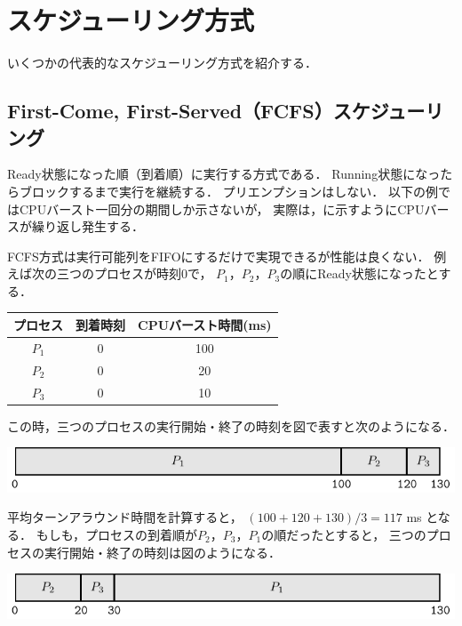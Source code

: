 \section{スケジューリング方式}
いくつかの代表的なスケジューリング方式を紹介する．

\subsection{First-Come, First-Served（FCFS）スケジューリング}
Ready状態になった順（到着順）に実行する方式である．
Running状態になったらブロックするまで実行を継続する．
プリエンプションはしない．
以下の例ではCPUバースト一回分の期間しか示さないが，
実際は，に示すようにCPUバースが繰り返し発生する．

FCFS方式は実行可能列をFIFOにするだけで実現できるが性能は良くない．
例えば次の三つのプロセスが時刻0で，
$P_1$，$P_2$，$P_3$の順にReady状態になったとする．

\begin{center}
\begin{tabular}{c c c}
プロセス & 到着時刻 & CPUバースト時間(ms) \\
\hline
$P_1$    & 0 & 100 \\
$P_2$    & 0 & 20 \\
$P_3$    & 0 & 10 \\
\end{tabular}
\end{center}

この時，三つのプロセスの実行開始・終了の時刻を図で表すと次のようになる．

\begin{center}
\includegraphics[scale=1.0]{GanntChart/fcfs1.pdf}
\end{center}

平均ターンアラウンド時間を計算すると，
$(100+120+130) / 3 = 117$ ms となる．
もしも，プロセスの到着順が$P_2$，$P_3$，$P_1$の順だったとすると，
三つのプロセスの実行開始・終了の時刻は図のようになる．

\begin{center}
\includegraphics[scale=1.0]{GanntChart/fcfs2.pdf}
\end{center}

